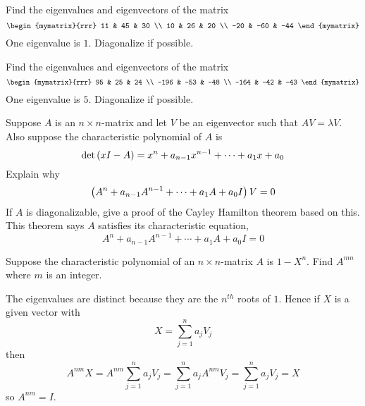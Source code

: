 \begin{enumialphparenastyle}
\begin{ex} Find the eigenvalues and eigenvectors of the matrix 
\begin{equation*}
\begin{mymatrix}{rrr}
11 & 45 & 30 \\
10 & 26 & 20 \\
-20 & -60 & -44
\end{mymatrix}
\end{equation*}
One eigenvalue is $1$. Diagonalize if possible.
\end{ex}

\begin{ex} Find the eigenvalues and eigenvectors of the matrix  
\begin{equation*}
\begin{mymatrix}{rrr}
95 & 25 & 24 \\
-196 & -53 & -48 \\
-164 & -42 & -43
\end{mymatrix}
\end{equation*}
One eigenvalue is $5$. Diagonalize if possible.
\end{ex}

\begin{ex} Suppose $A$ is an $n\times n$-matrix and let $V$ be an
eigenvector such that $AV=\lambda V$. Also suppose the
characteristic polynomial of $A$ is
\begin{equation*}
\det \left(x I-A\right) =x ^{n}+a_{n-1} x ^{n-1}+\cdots
+a_{1}x +a_{0}
\end{equation*}
Explain why
\begin{equation*}
\left(A^{n}+a_{n-1}A^{n-1}+\cdots +a_{1}A+a_{0}I\right) V=0
\end{equation*}
If $A$ is diagonalizable, give a proof of the Cayley Hamilton
theorem based on this. This theorem says $A$ satisfies its
characteristic equation,
\begin{equation*}
A^{n}+a_{n-1}A^{n-1}+\cdots +a_{1}A+a_{0}I=0
\end{equation*} 
\end{ex}

\begin{ex} Suppose the characteristic polynomial of an $n\times n$-matrix $A$ is 
$1-X ^{n}$. Find $A^{mn}$ where $m$ is an integer. 
\begin{sol}
The eigenvalues are distinct because
they are the $n^{th}$ roots of $1$. Hence if $X$ is a given vector with
\[
X=\sum_{j=1}^{n}a_{j}V_{j}
\]
then
\[
A^{nm}X=A^{nm}\sum_{j=1}^{n}a_{j}V_{j}=
\sum_{j=1}^{n}a_{j}A^{nm}V_{j}=\sum_{j=1}^{n}a_{j}V_{j}=X
\]
so $A^{nm}=I$.
\end{sol}
\end{ex}

\end{enumialphparenastyle}